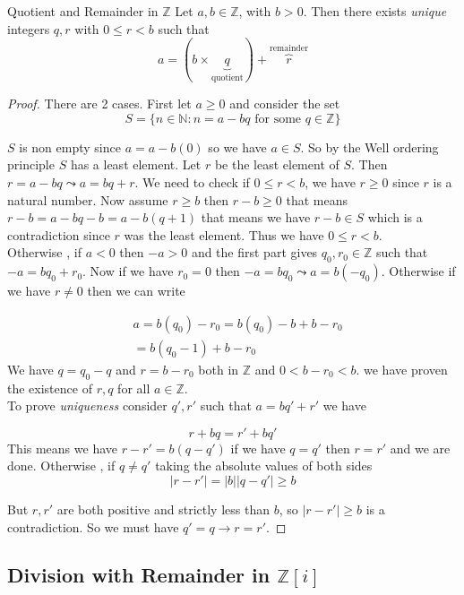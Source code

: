\documentclass[16pt,a4paper]{article}
\theoremstyle{definition}
\begin{document}
\begin{thm}{Quotient and Remainder in $\mathds{Z}$}{}
Let $a,b \in \mathbb{Z}$, with $b>0$. Then there exists \emph{unique} integers $q,r$ with $0\leq r < b$ such that 
\[a=\left(b\times\underbrace{q}_{\text{quotient}}\right)+\overbrace{r}^{\text{remainder}}\]
\end{thm}
\begin{proof}
There are 2 cases. First let $a\geq 0$ and consider the set 
\[S=\{n\in \mathbb{N} : n = a-bq \text{ for some $q\in \mathbb{Z}$}\}\]

$S$ is non empty since $a=a-b(0)$ so we have $a\in S$. So by the Well ordering principle $S$ has a least element. Let $r$ be the least element of $S$. Then $r=a-bq \leadsto a=bq+r$. We need to check if $0\leq r<b$, we have $r\geq 0$ since $r$ is a natural number. Now assume $r\geq b$ then $r-b\geq 0$ that means $r-b = a-bq-b = a-b(q+1)$ that means we have $r-b\in S$ which is a contradiction since $r$ was the least element. Thus we have $0\leq r < b$. 
\\

Otherwise , if $a<0$ then $-a>0$ and the first part gives $q_0,r_0 \in \mathbb{Z}$ such that $-a=bq_0 + r_0$. Now if we have $r_0 = 0$ then $-a=bq_0 \leadsto a=b(-q_0)$. Otherwise if we have $r\neq 0$ then we can write

\begin{align*}
& a= b(q_0)-r_0 = b(q_0)-b+b-r_0 \\
&= b(q_0 - 1) + b-r_0
\end{align*}
We have $q= q_0 -q$ and $r=b-r_0$ both in $\mathbb{Z}$ and $0<b-r_0 < b$. we have proven the existence of $r,q$ for all $a\in \mathbb{Z}$. 
\\


To prove \emph{uniqueness} consider $q',r'$ such that $a=bq'+r'$ we have 

\[r+bq = r'+bq'\]
This means we have $r-r' = b(q-q')$ if we have $q=q'$ then $r=r'$ and we are done. Otherwise , if $q\neq q'$ taking the absolute values of both sides
\[|r-r'| = |b||q-q'|\geq b\]

But $r,r'$ are both positive and strictly less than $b$, so $|r-r'|\geq b$ is a contradiction. So we must have $q'= q \rightarrow r=r'$. 
\end{proof}
\newpage
\subsection{Division with Remainder in $\mathds{Z}[i]$} 
\end{document}
